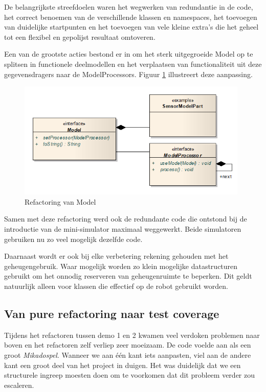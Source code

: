 \documentclass[12pt,a4paper]{report}
\begin{document}
De belangrijkste streefdoelen waren het wegwerken van redundantie in de code, het correct benoemen van de verschillende klassen en namespaces, het toevoegen van duidelijke startpunten en het toevoegen van vele kleine extra's die het geheel tot een flexibel en gepolijst resultaat omtoveren.

Een van de grootste acties bestond er in om het sterk uitgegroeide Model op te splitsen in functionele deelmodellen en het verplaatsen van functionaliteit uit deze gegevensdragers naar de ModelProcessors. Figuur \ref{uml:refactoring} illustreert deze aanpassing.

\begin{figure}[htbp]
  \centering
  \includegraphics[width=110mm]{resources/refactoring-model.png}
  \caption{Refactoring van Model}
  \label{uml:refactoring}
\end{figure}

Samen met deze refactoring werd ook de redundante code die ontstond bij de introductie van de mini-simulator maximaal weggewerkt. Beide simulatoren gebruiken nu zo veel mogelijk dezelfde code.

Daarnaast wordt er ook bij elke verbetering rekening gehouden met het geheugengebruik. Waar mogelijk worden zo klein mogelijke datastructuren gebruikt om het onnodig reserveren van geheugenruimte te beperken. Dit geldt natuurlijk alleen voor klassen die effectief op de robot gebruikt worden.

\subsection{Van pure refactoring naar test coverage}

Tijdens het refactoren tussen demo 1 en 2 kwamen veel verdoken problemen naar boven en het refactoren zelf verliep zeer moeizaam. De code voelde aan als een groot \emph{Mikadospel}. Wanneer we aan \'e\'en kant iets aanpasten, viel aan de andere kant een groot deel van het project in duigen. Het was duidelijk dat we een structurele ingreep moesten doen om te voorkomen dat dit probleem verder zou escaleren.
\end{document}
